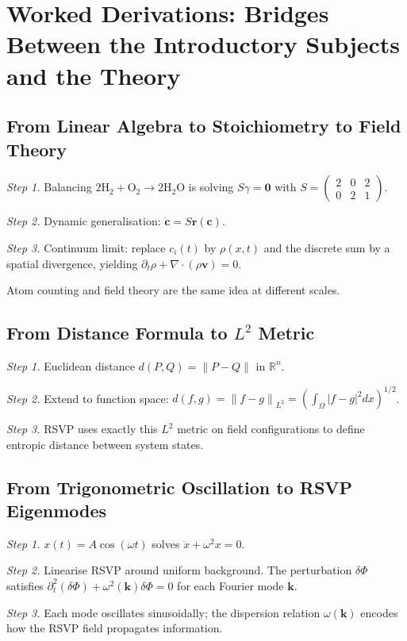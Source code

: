 \documentclass[11pt, openany]{book}
\theoremstyle{plain}
\theoremstyle{definition}
\theoremstyle{remark}
\newcommand{\R}{\mathbb{R}}
\newcommand{\norm}[1]{\left\lVert#1\right\rVert}
\begin{document}
\chapter{Worked Derivations: Bridges Between the Introductory Subjects and the Theory}

\section{From Linear Algebra to Stoichiometry to Field Theory}

\textit{Step 1.} Balancing $2\mathrm{H_2+O_2\to2H_2O}$ is solving
$S\gamma=\mathbf{0}$ with
$S=\begin{pmatrix}2&0&2\\0&2&1\end{pmatrix}$.

\textit{Step 2.} Dynamic generalisation: $\dot{\mathbf{c}}=S\mathbf{r}(\mathbf{c})$.

\textit{Step 3.} Continuum limit: replace $c_i(t)$ by $\rho(x,t)$ and
the discrete sum by a spatial divergence, yielding
$\partial_t\rho+\nabla\cdot(\rho\mathbf{v})=0$.

Atom counting and field theory are the same idea at different scales.

\section{From Distance Formula to $L^2$ Metric}

\textit{Step 1.} Euclidean distance $d(P,Q)=\norm{P-Q}$ in $\R^n$.

\textit{Step 2.} Extend to function space:
$d(f,g)=\norm{f-g}_{L^2}=\left(\int_\Omega|f-g|^2dx\right)^{1/2}$.

\textit{Step 3.} RSVP uses exactly this $L^2$ metric on field configurations
to define entropic distance between system states.

\section{From Trigonometric Oscillation to RSVP Eigenmodes}

\textit{Step 1.} $x(t)=A\cos(\omega t)$ solves $\ddot{x}+\omega^2x=0$.

\textit{Step 2.} Linearise RSVP around uniform background. The perturbation
$\delta\Phi$ satisfies $\partial_t^2(\delta\Phi)+\omega^2(\mathbf{k})\delta\Phi=0$
for each Fourier mode $\mathbf{k}$.

\textit{Step 3.} Each mode oscillates sinusoidally; the dispersion relation
$\omega(\mathbf{k})$ encodes how the RSVP field propagates information.
\end{document}
